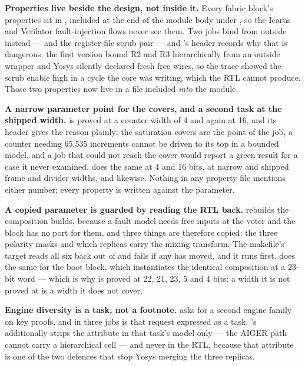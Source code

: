 \textbf{Properties live beside the design, not inside it.} Every fabric
block's properties sit in , included at the end of
the module body under , so the Icarus and Verilator
fault-injection flows never see them. Two jobs bind from outside
instead ---  and the register-file scrub pair --- and
's header records why that is dangerous: the
first version bound R2 and R3 hierarchically from an outside wrapper and
Yosys silently declared fresh free wires, so the trace showed the scrub
enable high in a cycle the core was writing, which the RTL cannot
produce. Those two properties now live in a file included \emph{into} the
module.

\textbf{A narrow parameter point for the covers, and a second task at the
shipped width.}  is proved at a counter width of 4 and
again at 16, and its header gives the reason plainly: the saturation
covers are the point of the job, a counter needing 65,535 increments
cannot be driven to its top in a bounded model, and a job that could not
reach the cover would report a green result for a case it never examined.
 does the same at 4 and 16 bits,  at
narrow and shipped frame and divider widths,  and
 likewise. Nothing in any property file mentions either
number; every property is written against the parameter.

\textbf{A copied parameter is guarded by reading the RTL back.}
 rebuilds the composition 
builds, because a fault model needs free inputs at the voter and the
block has no port for them, and three things are therefore copied: the
three polarity masks and which replicas carry the mixing transform. The
makefile's  target reads all six back out of
 and fails if any has moved, and it runs
first.  does the same for the boot block, which
instantiates the identical composition at a 23-bit word --- which is why
 is proved at 22, 21, 23, 5 and 4 bits: a width it is
not proved at is a width it does not cover.

\textbf{Engine diversity is a task, not a footnote.}
 asks for a second engine family on key proofs, and
 in three jobs is that request expressed as a task.
's  additionally strips the
 attribute in that task's model only --- the AIGER
path cannot carry a hierarchical cell --- and never in the RTL, because
that attribute is one of the two defences that stop Yosys merging the
three replicas.

